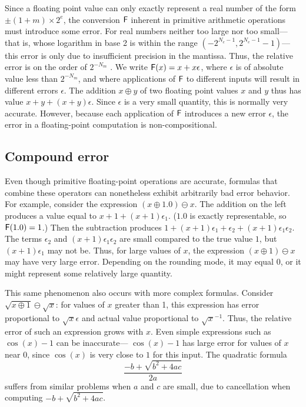 \documentclass[paper.tex]{subfiles}
\begin{document}
Since a floating point value can only exactly represent a real number
of the form $\pm(1 + m) \times 2^e$, the conversion $\mathsf{F}$ inherent in
primitive arithmetic operations must introduce some error.  For real
numbers neither too large nor too small---%
that is, whose logarithm in base 2 is within the range $(-2^{N_e-1},
2^{N_e-1} - 1)$---%
this error is only due to insufficient precision in the mantissa.
Thus, the relative error is on the order of $2^{-N_m}$ .  We write $\mathsf{F}(x) = x + x\epsilon$, where $\epsilon$
is of absolute value less than $2^{-N_m}$, and where applications of
$\mathsf{F}$ to different inputs will result in different errors $\epsilon$.
The addition $x \oplus y$ of two floating point values $x$ and $y$
thus has value $x + y + (x + y)\epsilon$.  Since $\epsilon$ is a very
small quantity, this is normally very accurate.  However, because each
application of $\mathsf{F}$ introduces a new error $\epsilon$, the error in a
floating-point computation is non-compositional.

\subsection{Compound error}

Even though primitive floating-point operations are accurate, formulas
that combine these operators can nonetheless exhibit arbitrarily bad
error behavior.  For example, consider the expression $(x \oplus 1.0)
\ominus x$.  The addition on the left produces a value equal to $x + 1
+ (x + 1)\epsilon_1$.  ($1.0$ is exactly representable, so $\mathsf{F}(1.0) =
1$.)  Then the subtraction produces $1 + (x + 1) \epsilon_1 +
\epsilon_2 + (x + 1) \epsilon_1 \epsilon_2$.  The terms $\epsilon_2$
and $(x+1)\epsilon_1\epsilon_2$ are small compared to the true value
$1$, but $(x + 1) \epsilon_1$ may not be.  Thus, for large values of
$x$, the expression $(x \oplus 1) \ominus x$ may have very large
error.  Depending on the rounding mode, it may equal $0$, or it might
represent some relatively large quantity.

This same phenomenon also occurs with more complex formulas.  Consider
$\sqrt{x \oplus 1} \ominus \sqrt{x}$: for values of $x$ greater than
1, this expression has error proportional to $\sqrt{x} \epsilon$ and
actual value proportional to $\sqrt{x}^{-1}$.  Thus, the relative
error of such an expression grows with $x$.  Even simple expressions
such as $\cos(x) - 1$ can be inaccurate---%
$\cos(x) - 1$ has large error for values of $x$ near 0, since
$\cos(x)$ is very close to $1$ for this input.  The quadratic
formula \[\frac{-b + \sqrt{b^2 + 4 a c}}{2 a}\] suffers from similar
problems when $a$ and $c$ are small, due to cancellation when
computing $-b + \sqrt{b^2 + 4 a c}$.
\end{document}
